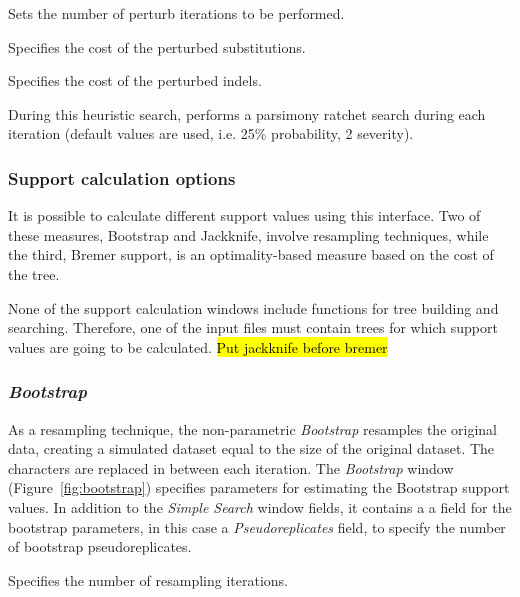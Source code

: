 {\begin{description}
\setlength{\labelsep}{5pt}
\setlength{\itemindent}{0pt}%
    \item[Perturb iterations] Sets the number of perturb iterations to be performed.
    \item[Substitutions] Specifies the cost of the perturbed substitutions.
    \item[Indels] Specifies the cost of the perturbed indels.
\end{description}

During this heuristic search, \poy performs a parsimony ratchet search during each iteration (default values are used, i.e. 25\% probability, 2 severity).

\subsubsection{Support calculation options}

It is possible to calculate different support values using this interface.  Two of these measures, Bootstrap and Jackknife, involve resampling techniques, while the third, Bremer support, is an optimality-based measure based on the cost of the tree. 

None of the support calculation windows include functions for tree building and searching. Therefore, one of the input files must contain trees for which support values are going to be calculated. \hl{Put jackknife before bremer}

\subsubsection*{\emph{Bootstrap}}

As a resampling technique, the non-parametric \emph{Bootstrap} resamples the original data, creating a simulated dataset equal to the size of the original dataset.  The characters are replaced in between each iteration. The \emph{Bootstrap} window (Figure~\ref{fig:bootstrap}) specifies parameters for estimating the Bootstrap support values. In addition to the \emph{Simple Search} window fields, it contains a a field for the bootstrap parameters, in this case a \emph{Pseudoreplicates} field, to specify the number of bootstrap pseudoreplicates.

\begin{description}
\setlength{\labelsep}{5pt}
\setlength{\itemindent}{0pt}%
    \item[Pseudoreplicates] Specifies the number of resampling iterations.
\end{description}

}
